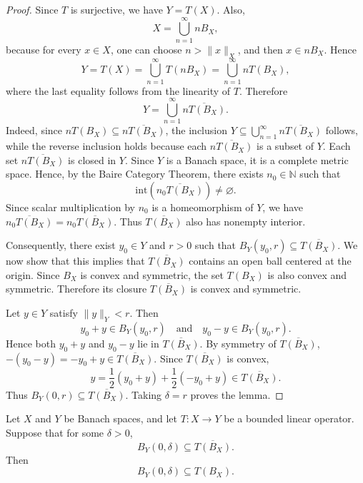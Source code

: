 \begin{proof}
    Since \(T\) is surjective, we have \(Y = T(X)\). Also,
    \[
        X = \bigcup_{n=1}^{\infty} n B_X,
    \]
    because for every \(x \in X\), one can choose \(n > \lVert x \rVert_X\), and then \(x \in n B_X\). Hence
    \[
        Y = T(X) = \bigcup_{n=1}^{\infty} T(n B_X) = \bigcup_{n=1}^{\infty} n T(B_X),
    \]
    where the last equality follows from the linearity of \(T\). Therefore
    \[
        Y = \bigcup_{n=1}^{\infty} \overline{n T(B_X)}.
    \]
    Indeed, since \(n T(B_X) \subseteq \overline{n T(B_X)}\), the inclusion \(Y \subseteq \bigcup_{n=1}^{\infty} \overline{n T(B_X)}\) follows, while the reverse inclusion holds because each \(\overline{n T(B_X)}\) is a subset of \(Y\). Each set \( \overline{n T(B_X)}\) is closed in \(Y\). Since \(Y\) is a Banach space, it is a complete metric space. Hence, by the Baire Category Theorem, there exists \(n_0 \in \mathbb{N}\) such that
    \[
        \mathrm{int}\!\left( \overline{n_0 T(B_X)} \right) \neq \varnothing.
    \]
    Since scalar multiplication by \(n_0\) is a homeomorphism of \(Y\), we have \( \overline{n_0 T(B_X)} = n_0 \overline{T(B_X)}\). Thus \(\overline{T(B_X)}\) also has nonempty interior.

    Consequently, there exist \(y_0 \in Y\) and \(r > 0\) such that \(B_Y(y_0, r) \subseteq \overline{T(B_X)}\). We now show that this implies that \(\overline{T(B_X)}\) contains an open ball centered at the origin. Since \(B_X\) is convex and symmetric, the set \(T(B_X)\) is also convex and symmetric. Therefore its closure \(\overline{T(B_X)}\) is convex and symmetric.

    Let \(y \in Y\) satisfy \(\lVert y \rVert_Y < r\). Then
    \[
        y_0 + y \in B_Y(y_0, r) \quad \text{and} \quad y_0 - y \in B_Y(y_0, r).
    \]
    Hence both \(y_0 + y\) and \(y_0 - y\) lie in \(\overline{T(B_X)}\). By symmetry of \(\overline{T(B_X)}\), \(-(y_0 - y) = -y_0 + y \in \overline{T(B_X)}\). Since \(\overline{T(B_X)}\) is convex,
    \[
        y = \frac{1}{2}(y_0 + y) + \frac{1}{2}(-y_0 + y) \in \overline{T(B_X)}.
    \]
    Thus \(B_Y(0, r) \subseteq \overline{T(B_X)}\). Taking \(\delta = r\) proves the lemma.
\end{proof}

\begin{lemma} \label{lm: open mapping step 2}
    Let \(X\) and \(Y\) be Banach spaces, and let \(T : X \to Y\) be a bounded linear operator. Suppose that for some \(\delta > 0\),
    \[
        B_Y(0, \delta) \subseteq \overline{T(B_X)}.
    \]
    Then
    \[
        B_Y(0, \delta) \subseteq T(B_X).
    \]
\end{lemma}

